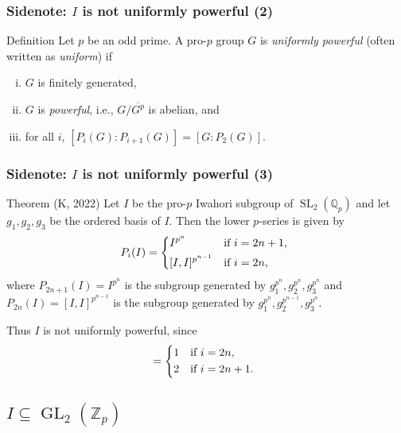 \documentclass{beamer}
\newcommand*\Z{\mathbb{Z}}
\newcommand*\Q{\mathbb{Q}}
\DeclareMathOperator{\GL}{GL} %
\DeclareMathOperator{\SL}{SL} %
\begin{document}
\begin{frame}
  \frametitle{Sidenote: $I$ is not uniformly powerful (2)}

  \begin{block}{Definition}
    Let $p$ be an odd prime. A pro-$p$ group $G$ is \emph{uniformly powerful} (often written as \emph{uniform}) if
    \begin{enumerate}[(i)]
      \item $G$ is finitely generated,
      \item $G$ is \emph{powerful}, i.e., $G/\overline{G^{p}}$ is abelian, and
      \item for all $i$, $[P_{i}(G) : P_{i+1}(G)] = [G : P_{2}(G)]$.
    \end{enumerate}
  \end{block}
\end{frame}

\begin{frame}
  \frametitle{Sidenote: $I$ is not uniformly powerful (3)}

  \begin{block}{Theorem (K, 2022)}
    Let $I$ be the pro-$p$ Iwahori subgroup of $\SL_{2}(\Q_{p})$ and let $g_{1},g_{2},g_{3}$ be the ordered basis of $I$. Then the lower $p$-series is given by
    \begin{equation*}
      P_{i}(I) =
      \begin{dcases*}
        I^{p^{n}} & if $i = 2n+1$, \\
        [I,I]^{p^{n-1}} & if $i = 2n$,
      \end{dcases*}
    \end{equation*}
    where $P_{2n+1}(I) = I^{p^{n}}$ is the subgroup generated by $g_{1}^{p^{n}},g_{2}^{p^{n}},g_{3}^{p^{n}}$ and $P_{2n}(I) = [I,I]^{p^{n-1}}$ is the subgroup generated by $g_{1}^{p^{n}},g_{2}^{p^{n-1}},g_{3}^{p^{n}}$.

    Thus $I$ is not uniformly powerful, since
    \begin{equation*}
      [P_{i}(G) : P_{i+1}(G)] =
      \begin{dcases*}
        1 & if $i = 2n$, \\
        2 & if $i = 2n+1$.
      \end{dcases*}
    \end{equation*}
  \end{block}
\end{frame}


\subsection{\texorpdfstring{$I \subseteq \GL_{2}(\Z_{p})$}{I in GL2(Zp)}}
\end{document}
